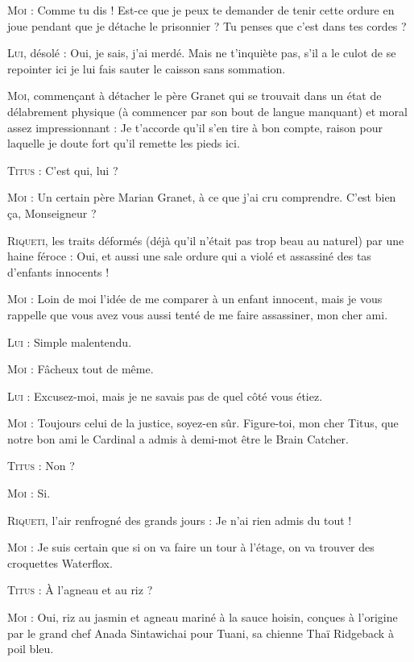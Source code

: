 \begin{dialogue}

\textsc{Moi} : Comme tu dis ! Est-ce que je peux te demander de tenir cette ordure en joue pendant que je détache le prisonnier ? Tu penses que c’est dans tes cordes ?

\textsc{Lui}, désolé : Oui, je sais, j’ai merdé. Mais ne t’inquiète pas, s’il a le culot de se repointer ici je lui fais sauter le caisson sans sommation.

\textsc{Moi}, commençant à détacher le père Granet qui se trouvait dans un état de délabrement physique (à commencer par son bout de langue manquant) et moral assez impressionnant : Je t’accorde qu’il s’en tire à bon compte, raison pour laquelle je doute fort qu’il remette les pieds ici.

\textsc{Titus} : C’est qui, lui ?

\textsc{Moi} : Un certain père Marian Granet, à ce que j’ai cru comprendre. C’est bien ça, Monseigneur ?

\textsc{Riqueti}, les traits déformés (déjà qu’il n’était pas trop beau au naturel) par une haine féroce : Oui, et aussi une sale ordure qui a violé et assassiné des tas d’enfants innocents !

\textsc{Moi} : Loin de moi l’idée de me comparer à un enfant innocent, mais je vous rappelle que vous avez vous aussi tenté de me faire assassiner, mon cher ami.

\textsc{Lui} : Simple malentendu.

\textsc{Moi} : Fâcheux tout de même.

\textsc{Lui} : Excusez-moi, mais je ne savais pas de quel côté vous étiez.

\textsc{Moi} : Toujours celui de la justice, soyez-en sûr. Figure-toi, mon cher Titus, que notre bon ami le Cardinal a admis à demi-mot être le Brain Catcher.

\textsc{Titus} : Non ?

\textsc{Moi} : Si.

\textsc{Riqueti}, l’air renfrogné des grands jours : Je n’ai rien admis du tout !

\textsc{Moi} : Je suis certain que si on va faire un tour à l’étage, on va trouver des croquettes Waterflox.

\textsc{Titus} : À l’agneau et au riz ?

\illusloflabel{}%
% 
%
\textsc{Moi} : Oui, riz au jasmin et agneau mariné à la sauce hoisin, conçues à l’origine par le grand chef Anada Sintawichai pour Tuani, sa chienne Thaï Ridgeback à poil bleu.


\end{dialogue}
